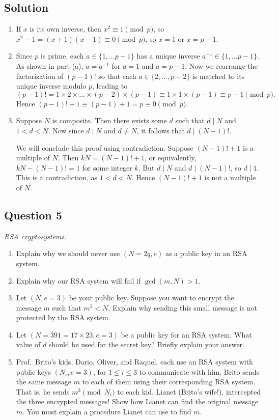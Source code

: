 \documentclass{article}
\begin{document}
\subsection*{Solution}
    \begin{enumerate}
        \item If $x$ is its own inverse, then $x^{2} \equiv 1 \pmod{p}$, so $x^{2} - 1 = (x + 1)(x - 1) \equiv 0 \pmod{p}$, so $x = 1$ or $x = p - 1$.
        \item Since $p$ is prime, each $a \in \{1, \dots p - 1\}$ has a unique inverse $a^{-1} \in \{1, \dots p - 1\}$. As shown in part (a), $a = a^{-1}$ for $a = 1$ and $a = p - 1$. Now we rearrange the factorization of $(p - 1)!$ so that each $a \in \{2, \dots, p - 2\}$ is matched to its unique inverse modulo $p$, leading to
        $$(p - 1)! = 1 \times 2 \times \dots \times (p - 2) \times (p - 1) \equiv 1 \times 1 \times (p - 1) \equiv p - 1 \pmod{p}.$$ Hence $(p - 1)! + 1 \equiv (p - 1) + 1 = p \equiv 0 \pmod{p}$.
        \item Suppose $N$ is composite. Then there exists some $d$ such that $d \mid N$ and $1 < d < N$. Now since $d \mid N$ and $d \ne N$, it follows that $d \mid (N - 1)!$. 
        
        \vspace{1.5mm}
        We will conclude this proof using contradiction. Suppose $(N - 1)! + 1$ is a multiple of $N$. Then $kN = (N - 1)! + 1$, or equivalently, $kN - (N - 1)! = 1$ for some integer $k$. But $d \mid N$ and $d \mid (N - 1)!$, so $d \mid 1$. This is a contradiction, as $1 < d < N$. Hence $(N - 1)! + 1$ is not a multiple of $N$.
    \end{enumerate}

\subsection*{Question 5}
    \textit{RSA cryptosystems.}
    \begin{enumerate}
        \item Explain why we should never use $(N = 2q, e)$ as a public key in an RSA system.
        \item Explain why our RSA system will fail if $\gcd(m, N) > 1$.
        \item Let $(N, e = 3)$ be your public key. Suppose you want to encrypt the message $m$ such that $m^{3} < N$. Explain why sending this small message is not protected by the RSA system.
        \item Let $(N = 391 = 17 \times 23, e = 3)$ be a public key for an RSA system. What value of $d$ should be used for the secret key? Briefly explain your answer.
        \item Prof.\ Brito's kids, Dario, Oliver, and Raquel, each use an RSA system with public keys $(N_{i}, e = 3)$, for $1 \le i \le 3$ to communicate with him. Brito sends the same message $m$ to each of them using their corresponding RSA system. That is, he sends $m^{3} \pmod{N_{i}}$ to each kid. Lianet (Brito's wife!), intercepted the three encrypted messages! Show how Lianet can find the original message $m$. You must explain a procedure Lianet can use to find $m$.
    \end{enumerate}
\end{document}
